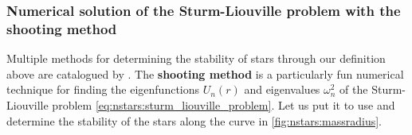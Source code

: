 

\subsubsection{Numerical solution of the Sturm-Liouville problem with the shooting method}

Multiple methods for determining the stability of stars through our definition above are catalogued by \cite{ref:stability_methods}.
The \textbf{shooting method} is a particularly fun numerical technique for finding the eigenfunctions $U_n(r)$ and eigenvalues $\omega_n^2$ of the Sturm-Liouville problem \eqref{eq:nstars:sturm_liouville_problem}.
Let us put it to use and determine the stability of the stars along the curve in \cref{fig:nstars:massradius}.

